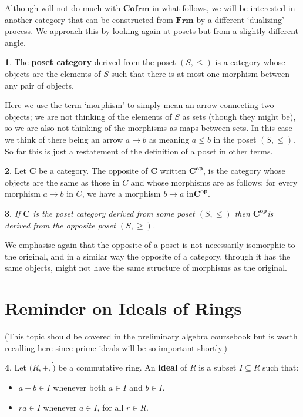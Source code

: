 \documentclass[oneside,english]{amsbook}
\numberwithin{section}{chapter}
\theoremstyle{plain}
\newtheorem{thm}{\protect\theoremname}
\theoremstyle{definition}
\newtheorem{defn}[thm]{\protect\definitionname}
\providecommand{\definitionname}{Definition}
\providecommand{\theoremname}{Theorem}
\begin{document}
Although will not do much with \textbf{$\mathbf{Cofrm}$} in what follows, we will be interested in another category that can be constructed from \textbf{$\mathbf{Frm}$} by a different `dualizing' process. We approach this by looking again at posets but from a slightly different angle. 

\begin{defn} 
	The \textbf{poset category} derived from the poset $(S,\le)$ is a category whose objects are the elements of $S$ such that there is at most one morphism between any pair of objects. 
\end{defn} 

Here we use the term `morphism' to simply mean an arrow connecting two objects; we are not thinking of the elements of $S$ as sets (though they might be), so we are also not thinking of the morphisms as maps between sets. In this case we think of there being an arrow $a\to b$ as meaning $a\le b$ in the poset $(S,\le)$. So far this is just a restatement of the definition of a poset in other terms. 

\begin{defn} 
	Let \textbf{$\mathbf{C}$ }be a category. The opposite of \textbf{$\mathbf{C}$} written $\mathbf{C^{op}}$, is the category whose objects are the same as those in $C$ and whose morphisms are as follows: for every morphism $a\to b$ in $C$, we have a morphism $b\to a$ in$\mathbf{C^{op}}$.
\end{defn} 

\begin{thm} 
	If \textbf{$\mathbf{C}$ }is the poset category derived from some poset $(S,\le)$ then $\mathbf{C^{op}}$is derived from the opposite poset $(S,\ge)$. 
\end{thm} 

We emphasise again that the opposite of a poset is not necessarily isomorphic to the original, and in a similar way the opposite of a category, through it has the same objects, might not have the same structure of morphisms as the original.

\section{Reminder on Ideals of Rings}

(This topic should be covered in the preliminary algebra coursebook but is worth recalling here since prime ideals will be so important shortly.)

\begin{defn}Let $(R, +, \dot)$ be a commutative ring. An \textbf{ideal} of $R$ is a subset $I\subseteq R$ such that:
	\begin{itemize}
		\item{$a + b\in I$ whenever both $a\in I$ and $b\in I$.}
		\item{$ra\in I$ whenever $a\in I$, for all $r\in R$.}
	\end{itemize}
\end{defn}
\end{document}
